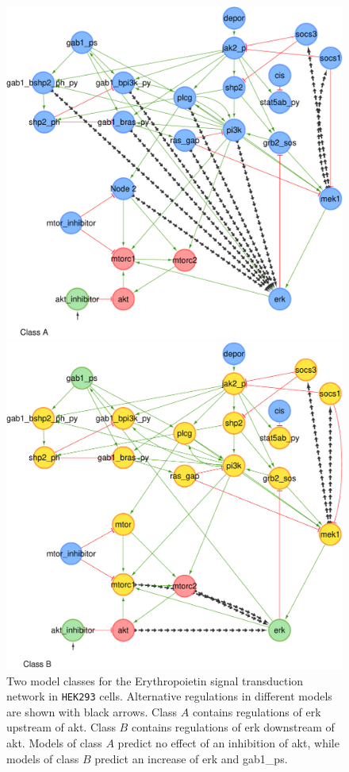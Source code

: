 \begin{figure}[h]
\begin{center}
 \includegraphics[scale=.45,keepaspectratio=true]{./figures/wt_model_class_A.pdf}

 \includegraphics[scale=.45,keepaspectratio=true]{./figures/wt_model_class_B.pdf}
 \end{center}
 \caption{
   Two model classes for the Erythropoietin signal transduction network in \texttt{HEK293} cells.
   Alternative regulations in different models are shown with black arrows.
   Class $A$ contains regulations of {\sffamily erk} upstream of {\sffamily akt}.
   Class $B$ contains regulations of {\sffamily erk} downstream of {\sffamily akt}.
   Models of class $A$ predict no effect of an inhibition of {\sffamily akt},
   while models of class $B$ predict an increase of {\sffamily erk} and {\sffamily gab1\_ps}.
 }
 \label{fig:modeltypeAB1}
\end{figure}

